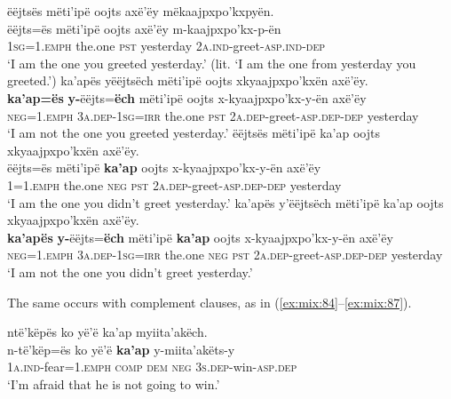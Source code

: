 \documentclass[output=paper,colorlinks,citecolor=brown,draft]{langscibook}
\begin{document}
\ea\label{ex:mix:83}
    \ea\label{ex:mix:83a}
        \glll ëëjtsës {\ob}mëti’ipë oojts axë’ëy mëkaajpxpo’kxpyën{\cb}.\\ 
              ëëjts=ës {\db}mëti’ipë oojts axë’ëy m-kaajpxpo’kx-p-ën\\
              \textsc{1sg}=1.\textsc{emph} the.one \textsc{pst} yesterday \textsc{2a.ind}{}-greet-\textsc{asp.ind}{}-\textsc{dep}\\
        \glt ‘I am the one you greeted yesterday.’ (lit. ‘I am the one from yesterday you greeted.’)
    \ex\label{ex:mix:83b}
        \glll ka’apës yëëjtsëch {\ob}mëti’ipë oojts xkyaajpxpo’kxën axë’ëy{\cb}. \\
             \textbf{ka’ap=ës} \textbf{y-}ëëjts=\textbf{ëch} {\db}mëti’ipë oojts x-kyaajpxpo’kx-y-ën axë’ëy\\
             \textsc{neg}=1.\textsc{emph} \textsc{3a.dep-1sg}=\textsc{irr} the.one \textsc{pst} \textsc{2a.dep}{}-greet-\textsc{asp.dep-dep} yesterday\\
        \glt ‘I am not the one you greeted yesterday.’
    \ex\label{ex:mix:83c}
        \glll ëëjtsës {\ob}mëti’ipë ka’ap oojts xkyaajpxpo’kxën axë’ëy{\cb}.\\ 
              ëëjts=ës {\db}mëti’ipë \textbf{ka’ap} oojts x-kyaajpxpo’kx-y-ën axë’ëy\\
              \textsc{1}=1.\textsc{emph} the.one \textsc{neg} \textsc{pst} \textsc{2a.dep}{}-greet-\textsc{asp.dep-dep} yesterday \\
        \glt ‘I am the one you didn’t greet yesterday.’
    \ex\label{ex:key83d}
        \glll ka’apës y’ëëjtsëch {\ob}mëti’ipë ka’ap oojts xkyaajpxpo’kxën axë’ëy{\cb}.\\
             \textbf{ka’apës} \textbf{y-}ëëjts=\textbf{ëch} {\db}mëti’ipë \textbf{ka’ap} oojts x-kyaajpxpo’kx-y-ën axë’ëy\\
             \textsc{neg}=1.\textsc{emph} \textsc{3a.dep-1sg}=\textsc{irr} the.one \textsc{neg} \textsc{pst} \textsc{2a.dep}{}-greet-\textsc{asp.dep-dep} yesterday  \\
        \glt ‘I am not the one you didn’t greet yesterday.’
    \z
\z  

The same occurs with complement clauses, as in (\ref{ex:mix:84}--\ref{ex:mix:87}).

\ea\label{ex:mix:84}
    \glll ntë’këpës {\ob}ko yë’ë ka’ap myiita’akëch{\cb}.\\
          n-të’këp=ës {\db}ko yë’ë \textbf{ka’ap} y-miita’akëts-y \\
          1\textsc{a}.\textsc{ind}{}-fear=1.\textsc{emph} \textsc{comp} \textsc{dem} \textsc{neg} 3\textsc{s.dep}{}-win-\textsc{asp.dep}\\
    \glt ‘I’m afraid that he is not going to win.’
\z
\end{document}
